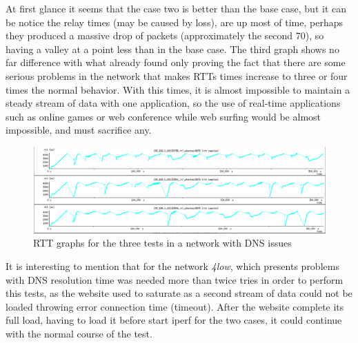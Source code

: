 At first glance it seems that the case two is better than the base case, but
it can be notice the relay times (may be caused by loss), are up most of time,
perhaps they produced a massive drop of packets (approximately the second 70),
so having a valley at a point less than in the base case. The third graph
shows no far difference with what already found only proving the fact that
there are some serious problems in the network that makes RTTs times increase
to three or four times the normal behavior. With this times, it is almost
impossible to maintain a steady stream of data with one application, so the
use of real-time applications such as online games or web conference while web
surfing would be almost impossible, and must sacrifice any.

\begin{figure}[ht]
\centering
    \includegraphics[width=\textwidth]{img/n_iperf_4low}
\caption[Iperf: RTT graphs for a network with DNS issues]{RTT graphs for the three tests in a network with DNS issues}
\label{fig:iperf4low}
\end{figure}%

It is interesting to mention that for the network \emph{4low}, which presents problems with DNS resolution time was needed more than twice tries in order to perform this tests, as the website used to saturate as a second stream of data could not be loaded throwing error connection time (timeout). After the website complete its full load, having to load it before start iperf for the two cases, it could continue with the normal course of the test.
